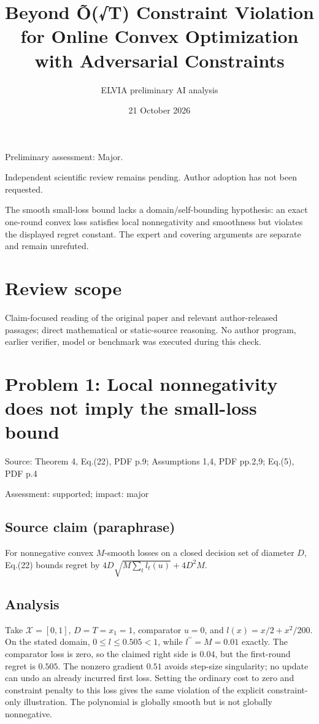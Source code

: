 \documentclass[11pt]{article}
\begin{document}
\title{Beyond Õ(√T) Constraint Violation for Online Convex Optimization with Adversarial Constraints}

\author{ELVIA preliminary AI analysis}\date{21 October 2026}\maketitle

Preliminary assessment: Major.\par

Independent scientific review remains pending. Author adoption has not been requested.

The smooth small-loss bound lacks a domain/self-bounding hypothesis: an exact one-round convex loss satisfies local nonnegativity and smoothness but violates the displayed regret constant. The expert and covering arguments are separate and remain unrefuted.

\section*{Review scope}

Claim-focused reading of the original paper and relevant author-released passages; direct mathematical or static-source reasoning. No author program, earlier verifier, model or benchmark was executed during this check.

\section*{Problem 1: Local nonnegativity does not imply the small-loss bound}

Source: Theorem 4, Eq.(22), PDF p.9; Assumptions 1,4, PDF pp.2,9; Eq.(5), PDF p.4

Assessment: supported; impact: major

\subsection*{Source claim (paraphrase)}

For nonnegative convex \(M\)-smooth losses on a closed decision set of diameter \(D\), Eq.(22) bounds regret by \(4D\sqrt{M\sum_t l_t(u)}+4D^2M\).

\subsection*{Analysis}

Take \(\mathcal X=[0,1]\), \(D=T=x_1=1\), comparator \(u=0\), and \(l(x)=x/2+x^2/200\). On the stated domain, \(0\le l\le0.505<1\), while \(l^{\prime\prime}=M=0.01\) exactly. The comparator loss is zero, so the claimed right side is \(0.04\), but the first-round regret is \(0.505\). The nonzero gradient \(0.51\) avoids step-size singularity; no update can undo an already incurred first loss. Setting the ordinary cost to zero and constraint penalty to this loss gives the same violation of the explicit constraint-only illustration. The polynomial is globally smooth but is not globally nonnegative.
\end{document}
